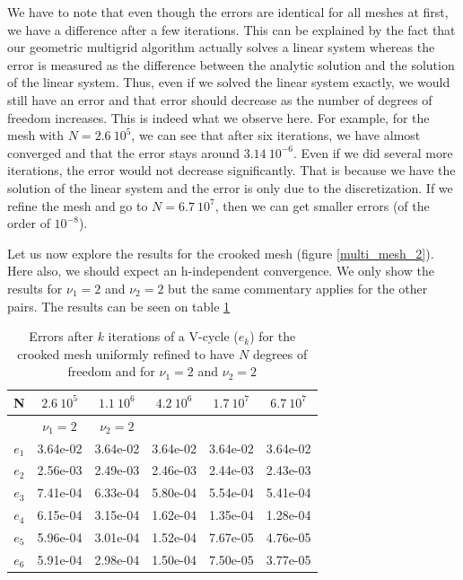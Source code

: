 We have to note that even though the errors are identical for all meshes at first, we have a difference after a few iterations. This can be explained by the fact that our geometric multigrid algorithm actually solves a linear system whereas the error is measured as the difference between the analytic solution and the solution of the linear system. Thus, even if we solved the linear system exactly, we would still have an error and that error should decrease as the number of degrees of freedom increases. This is indeed what we observe here. For example, for the mesh with $N=2.6\:10^5$, we can see that after six iterations, we have almost converged and that the error stays around $3.14\:10^{-6}$. Even if we did several more iterations, the error would not decrease significantly. That is because we have the solution of the linear system and the error is only due to the discretization. If we refine the mesh and go to $N=6.7\:10^7$, then we can get smaller errors (of the order of $10^{-8}$).

Let us now explore the results for the crooked mesh (figure \ref{multi_mesh_2}). Here also, we should expect an h-independent convergence. We only show the results for $\nu_1=2$ and $\nu_2=2$ but the same commentary applies for the other pairs. The results can be seen on table \ref{multi_err_crook}

\begin{table}
\centering
\begin{tabular}{c|ccccc}
\hline
N & $2.6\:10^5$ & $1.1\:10^6$ & $4.2\: 10^6$& $1.7\:10^7$ & $6.7\:10^7$ \\
 \hline
  & $\nu_1=2$ & $\nu_2=2$ & & &\\
  \hline
  $e_1$ & 3.64e-02 &	3.64e-02 &	3.64e-02 &	3.64e-02 &	3.64e-02\\
  $e_2$ & 2.56e-03 &	2.49e-03 &	2.46e-03	& 2.44e-03 &	2.43e-03\\
  $e_3$ & 7.41e-04 &	6.33e-04 &	5.80e-04 &	5.54e-04 &	5.41e-04\\
  $e_4$ & 6.15e-04 &	3.15e-04 &	1.62e-04 &	1.35e-04 &	1.28e-04\\
  $e_5$ & 5.96e-04 &	3.01e-04 &	1.52e-04 &	7.67e-05	& 4.76e-05\\
  $e_6$ & 5.91e-04 &	2.98e-04 &	1.50e-04 &	7.50e-05 &	3.77e-05\\
  \hline
\end{tabular}
\caption{Errors after $k$ iterations of a V-cycle ($e_k$) for the crooked mesh uniformly refined to have $N$ degrees of freedom and for $\nu_1=2$ and $\nu_2=2$}
\label{multi_err_crook}
\end{table}


